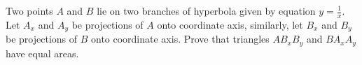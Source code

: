 Two points $A$ and $B$ lie on two branches of hyperbola given by equation $y=\frac1x$. Let $A_x$ and $A_y$ be projections of $A$ onto coordinate axis, similarly, let $B_x$ and $B_y$ be projections of $B$ onto coordinate axis. Prove that triangles $AB_xB_y$ and $BA_xA_y$ have equal areas.